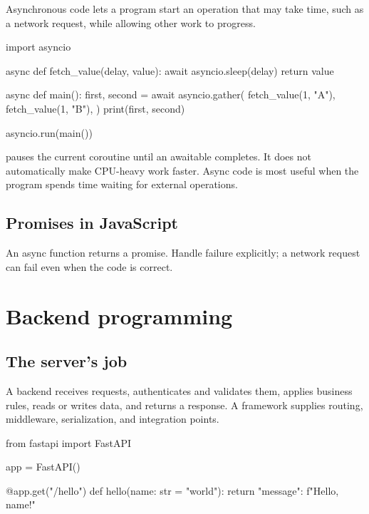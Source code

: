 \documentclass[11pt,openany,oneside]{book}
\newcommand{\inlinecode}[1]{\texttt{\small\detokenize{#1}}}
\begin{document}
Asynchronous code lets a program start an operation that may take time, such as a network request, while allowing other work to progress.

\begin{code}[language=Python]
import asyncio

async def fetch_value(delay, value):
    await asyncio.sleep(delay)
    return value

async def main():
    first, second = await asyncio.gather(
        fetch_value(1, "A"),
        fetch_value(1, "B"),
    )
    print(first, second)

asyncio.run(main())
\end{code}

\inlinecode{await} pauses the current coroutine until an awaitable completes. It does not automatically make CPU-heavy work faster. Async code is most useful when the program spends time waiting for external operations.

\section{Promises in JavaScript}


An async function returns a promise. Handle failure explicitly; a network request can fail even when the code is correct.

\chapter{Backend programming}

\section{The server's job}

A backend receives requests, authenticates and validates them, applies business rules, reads or writes data, and returns a response. A framework supplies routing, middleware, serialization, and integration points.

\begin{code}[language=Python]
from fastapi import FastAPI

app = FastAPI()

@app.get("/hello")
def hello(name: str = "world"):
    return {"message": f"Hello, {name}!"}
\end{code}
\end{document}
